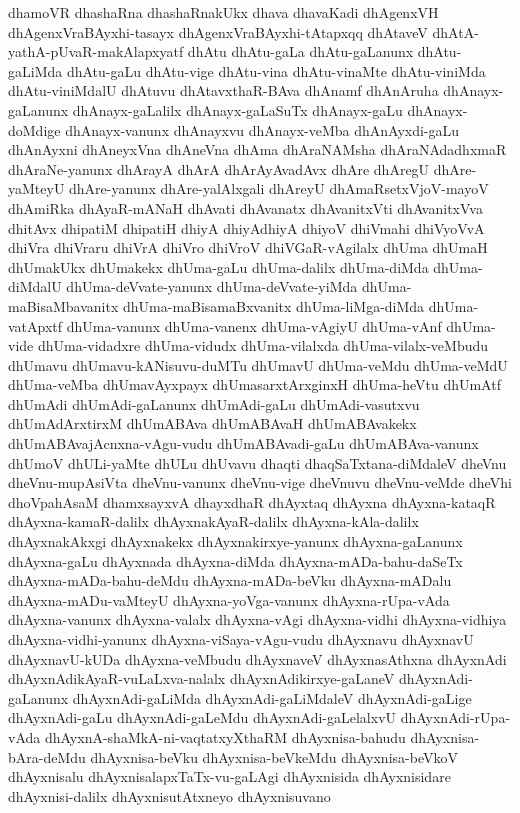 {dhamoVR
dhashaRna
dhashaRnakUkx
dhava
dhavaKadi
dhAgenxVH
dhAgenxVraBAyxhi-tasayx
dhAgenxVraBAyxhi-tAtapxqq
dhAtaveV
dhAtA-yathA-pUvaR-makAlapxyatf
dhAtu
dhAtu-gaLa
dhAtu-gaLanunx
dhAtu-gaLiMda
dhAtu-gaLu
dhAtu-vige
dhAtu-vina
dhAtu-vinaMte
dhAtu-viniMda
dhAtu-viniMdalU
dhAtuvu
dhAtavxthaR-BAva
dhAnamf
dhAnAruha
dhAnayx-gaLanunx
dhAnayx-gaLalilx
dhAnayx-gaLaSuTx
dhAnayx-gaLu
dhAnayx-doMdige
dhAnayx-vanunx
dhAnayxvu
dhAnayx-veMba
dhAnAyxdi-gaLu
dhAnAyxni
dhAneyxVna
dhAneVna
dhAma
dhAraNAMsha
dhAraNAdadhxmaR
dhAraNe-yanunx
dhArayA
dhArA
dhArAyAvadAvx
dhAre
dhAregU
dhAre-yaMteyU
dhAre-yanunx
dhAre-yalAlxgali
dhAreyU
dhAmaRsetxVjoV-mayoV
dhAmiRka
dhAyaR-mANaH
dhAvati
dhAvanatx
dhAvanitxVti
dhAvanitxVva
dhitAvx
dhipatiM
dhipatiH
dhiyA
dhiyAdhiyA
dhiyoV
dhiVmahi
dhiVyoVvA
dhiVra
dhiVraru
dhiVrA
dhiVro
dhiVroV
dhiVGaR-vAgilalx
dhUma
dhUmaH
dhUmakUkx
dhUmakekx
dhUma-gaLu
dhUma-dalilx
dhUma-diMda
dhUma-diMdalU
dhUma-deVvate-yanunx
dhUma-deVvate-yiMda
dhUma-maBisaMbavanitx
dhUma-maBisamaBxvanitx
dhUma-liMga-diMda
dhUma-vatApxtf
dhUma-vanunx
dhUma-vanenx
dhUma-vAgiyU
dhUma-vAnf
dhUma-vide
dhUma-vidadxre
dhUma-vidudx
dhUma-vilalxda
dhUma-vilalx-veMbudu
dhUmavu
dhUmavu-kANisuvu-duMTu
dhUmavU
dhUma-veMdu
dhUma-veMdU
dhUma-veMba
dhUmavAyxpayx
dhUmasarxtArxginxH
dhUma-heVtu
dhUmAtf
dhUmAdi
dhUmAdi-gaLanunx
dhUmAdi-gaLu
dhUmAdi-vasutxvu
dhUmAdArxtirxM
dhUmABAva
dhUmABAvaH
dhUmABAvakekx
dhUmABAvajAcnxna-vAgu-vudu
dhUmABAvadi-gaLu
dhUmABAva-vanunx
dhUmoV
dhULi-yaMte
dhULu
dhUvavu
dhaqti
dhaqSaTxtana-diMdaleV
dheVnu
dheVnu-mupAsiVta
dheVnu-vanunx
dheVnu-vige
dheVnuvu
dheVnu-veMde
dheVhi
dhoVpahAsaM
dhamxsayxvA
dhayxdhaR
dhAyxtaq
dhAyxna
dhAyxna-kataqR
dhAyxna-kamaR-dalilx
dhAyxnakAyaR-dalilx
dhAyxna-kAla-dalilx
dhAyxnakAkxgi
dhAyxnakekx
dhAyxnakirxye-yanunx
dhAyxna-gaLanunx
dhAyxna-gaLu
dhAyxnada
dhAyxna-diMda
dhAyxna-mADa-bahu-daSeTx
dhAyxna-mADa-bahu-deMdu
dhAyxna-mADa-beVku
dhAyxna-mADalu
dhAyxna-mADu-vaMteyU
dhAyxna-yoVga-vanunx
dhAyxna-rUpa-vAda
dhAyxna-vanunx
dhAyxna-valalx
dhAyxna-vAgi
dhAyxna-vidhi
dhAyxna-vidhiya
dhAyxna-vidhi-yanunx
dhAyxna-viSaya-vAgu-vudu
dhAyxnavu
dhAyxnavU
dhAyxnavU-kUDa
dhAyxna-veMbudu
dhAyxnaveV
dhAyxnasAthxna
dhAyxnAdi
dhAyxnAdikAyaR-vuLaLxva-nalalx
dhAyxnAdikirxye-gaLaneV
dhAyxnAdi-gaLanunx
dhAyxnAdi-gaLiMda
dhAyxnAdi-gaLiMdaleV
dhAyxnAdi-gaLige
dhAyxnAdi-gaLu
dhAyxnAdi-gaLeMdu
dhAyxnAdi-gaLelalxvU
dhAyxnAdi-rUpa-vAda
dhAyxnA-shaMkA-ni-vaqtatxyXthaRM
dhAyxnisa-bahudu
dhAyxnisa-bAra-deMdu
dhAyxnisa-beVku
dhAyxnisa-beVkeMdu
dhAyxnisa-beVkoV
dhAyxnisalu
dhAyxnisalapxTaTx-vu-gaLAgi
dhAyxnisida
dhAyxnisidare
dhAyxnisi-dalilx
dhAyxnisutAtxneyo
dhAyxnisuvano
}

